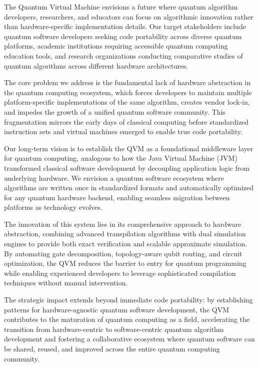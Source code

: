 The Quantum Virtual Machine envisions a future where quantum algorithm developers, researchers, and educators can focus on algorithmic innovation rather than hardware-specific implementation details. Our target stakeholders include quantum software developers seeking code portability across diverse quantum platforms, academic institutions requiring accessible quantum computing education tools, and research organizations conducting comparative studies of quantum algorithms across different hardware architectures.

The core problem we address is the fundamental lack of hardware abstraction in the quantum computing ecosystem, which forces developers to maintain multiple platform-specific implementations of the same algorithm, creates vendor lock-in, and impedes the growth of a unified quantum software community. This fragmentation mirrors the early days of classical computing before standardized instruction sets and virtual machines emerged to enable true code portability.

Our long-term vision is to establish the QVM as a foundational middleware layer for quantum computing, analogous to how the Java Virtual Machine (JVM) transformed classical software development by decoupling application logic from underlying hardware. We envision a quantum software ecosystem where algorithms are written once in standardized formats and automatically optimized for any quantum hardware backend, enabling seamless migration between platforms as technology evolves.

The innovation of this system lies in its comprehensive approach to hardware abstraction, combining advanced transpilation algorithms with dual simulation engines to provide both exact verification and scalable approximate simulation. By automating gate decomposition, topology-aware qubit routing, and circuit optimization, the QVM reduces the barrier to entry for quantum programming while enabling experienced developers to leverage sophisticated compilation techniques without manual intervention.

The strategic impact extends beyond immediate code portability: by establishing patterns for hardware-agnostic quantum software development, the QVM contributes to the maturation of quantum computing as a field, accelerating the transition from hardware-centric to software-centric quantum algorithm development and fostering a collaborative ecosystem where quantum software can be shared, reused, and improved across the entire quantum computing community.



